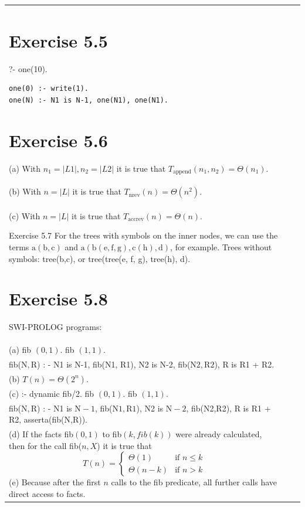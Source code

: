 \documentclass[10pt]{book}
\begin{document}
\begin{center}
\begin{tabular}{|l|l|l|}
\section{Exercise 5.5}
?- one(10).
\begin{verbatim}
one(0) :- write(1).
one(N) :- N1 is N-1, one(N1), one(N1).
\end{verbatim}

\section{Exercise 5.6}
(a) With $n_{1}=|L1|, n_{2}=|L2|$ it is true that $T_{\text{append}}(n_{1}, n_{2})=\Theta(n_{1})$.\\
(b) With $n=|L|$ it is true that $T_{\text{nrev}}(n)=\Theta(n^{2})$.\\
(c) With $n=|L|$ it is true that $T_{\text{accrev}}(n)=\Theta(n)$.

Exercise 5.7 For the trees with symbols on the inner nodes, we can use the terms $\mathrm{a}(\mathrm{b}, \mathrm{c})$ and $\mathrm{a}(\mathrm{b}(\mathrm{e}, \mathrm{f}, \mathrm{g}), \mathrm{c}(\mathrm{h}), \mathrm{d})$, for example. Trees without symbols: tree(b,c), or tree(tree(e, f, g), tree(h), d).

\section{Exercise 5.8}
SWI-PROLOG programs:\\
(a) fib $(0,1)$. fib $(1,1)$.\\
fib($\mathrm{N}, \mathrm{R}$) : - N1 is N-1, fib(N1, R1), N2 is N-2, fib($\mathrm{N}2, \mathrm{R}2$), R is R1 + R2.\\
(b) $T(n)=\Theta\left(2^{n}\right)$.\\
(c) :- dynamic fib/2. fib $(0,1)$. fib $(1,1)$.\\
fib($\mathrm{N}, \mathrm{R}$) : - N1 is $\mathrm{N}-1$, fib($\mathrm{N}1, \mathrm{R}1$), N2 is $\mathrm{N}-2$, fib(N2,R2), R is R1 + R2, asserta(fib(N,R)).\\
(d) If the facts fib$(0,1)$ to fib$(k, fib(k))$ were already calculated, then for the call fib($n, X$) it is true that
$$
T(n)= \begin{cases}\Theta(1) & \text{if } n \leq k \\ \Theta(n-k) & \text{if } n>k\end{cases}
$$
(e) Because after the first $n$ calls to the fib predicate, all further calls have direct access to facts.


\end{tabular}
\end{center}
\end{document}
